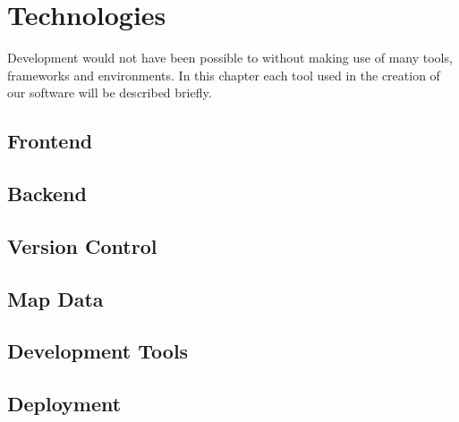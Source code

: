 \section{Technologies}

Development would not have been possible to without making use of many tools, frameworks and environments. In this chapter each tool used in the creation of our software will be described briefly.

%

%

\subsection{Frontend}


\subsection{Backend}


\subsection{Version Control}


\subsection{Map Data}


\subsection{Development Tools}


\subsection{Deployment}


\newpage